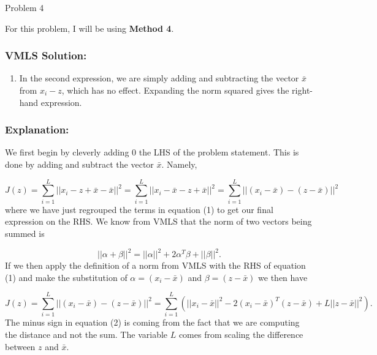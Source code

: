 \begin{problem}{Problem 4}
    \begin{highlight}
        \noindent For this problem, I will be using \textbf{Method 4}.

        \subsubsection*{VMLS Solution:}

        \begin{enumerate}[label = (\alph*)]
            \item In the second expression, we are simply adding and subtracting the vector $\bar{x}$ from $x_{i} - z$, which has no effect. Expanding the norm squared gives the right-hand expression.
        \end{enumerate}

        \subsubsection*{Explanation:}

        We first begin by cleverly adding 0 the LHS of the problem statement. This is done by adding and subtract the vector $\bar{x}$. Namely,

        \setcounter{equation}{0}
        \begin{equation}
            J(z) = \sum^{L}_{i = 1} ||x_{i} - z + \bar{x} - \bar{x}||^{2} = \sum^{L}_{i = 1} ||x_{i} - \bar{x} - z + \bar{x}||^{2} = \sum^{L}_{i = 1} ||(x_{i} - \bar{x}) - (z - \bar{x})||^{2}
        \end{equation}
        where we have just regrouped the terms in equation (1) to get our final expression on the RHS. We know from VMLS that the norm of two vectors being summed is 

        \begin{equation*}
            ||\alpha + \beta||^{2} = ||\alpha||^{2} + 2\alpha^{T}\beta + ||\beta||^{2}.
        \end{equation*}
        If we then apply the definition of a norm from VMLS with the RHS of equation (1) and make the substitution of $\alpha = (x_{i} - \bar{x})$ and $\beta = (z - \bar{x})$ we then have

        \begin{equation}
            J(z) = \sum^{L}_{i = 1} ||(x_{i} - \bar{x}) - (z - \bar{x})||^{2} = \sum^{L}_{i = 1} (||x_{i} - \bar{x}||^{2} - 2(x_{i} - \bar{x})^{T}(z - \bar{x}) + L||z - \bar{x}||^{2}).
        \end{equation}
        The minus sign in equation (2) is coming from the fact that we are computing the distance and not the sum. The variable $L$ comes from scaling the difference between $z$ and $\bar{x}$.
    \end{highlight}


\end{problem}
